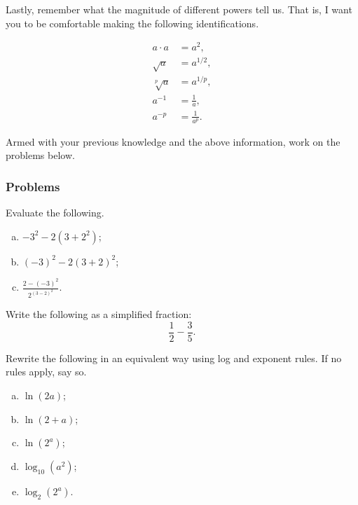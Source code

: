     Lastly, remember what the magnitude of different powers tell us.  That is, I want you to be comfortable making the following identifications.

    \begin{align*}
        a\cdot a &= a^2,\\
        \sqrt{a} &= a^{1/2},\\
        \sqrt[p]{a} &= a^{1/p},\\
        a^{-1} &= \frac{1}{a},\\
        a^{-p} &= \frac{1}{a^p}.
    \end{align*}

    Armed with your previous knowledge and the above information, work on the problems below.

    \subsubsection{Problems}

    \begin{problem}
    Evaluate the following.
    \begin{enumerate}[(a)]
        \item $-3^2-2(3+2^2)$;
        \item $(-3)^2-2(3+2)^2$;
        \item $\frac{2-(-3)^2}{2^{(3-2)^2}}$.
    \end{enumerate}
    \end{problem}

    \begin{problem}
    Write the following as a simplified fraction:
    \[
    \frac{1}{2}-\frac{3}{5}.
    \]
    \end{problem}

    \begin{problem}
    Rewrite the following in an equivalent way using log and exponent rules. If no rules apply, say so.
    \begin{enumerate}[(a)]
        \item $\ln(2a)$;
        \item $\ln(2+a)$;
        \item $\ln(2^a)$;
        \item $\log_{10}(a^2)$;
        \item $\log_2(2^a)$.
    \end{enumerate}
    \end{problem}

